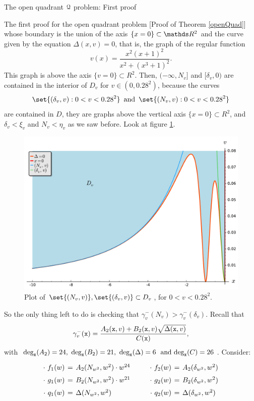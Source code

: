 \documentclass[11pt, a4paper, english, twoside, notitlepage, openright]{report}
\begin{document}
\begin{chapter}{The open quadrant $\mathcal{Q}$ problem: First proof}
\begin{section}{The first proof for the open quadrant problem} [Proof of Theorem \ref{openQuad}]
$$$$ 
whose boundary is the union of the axis $\{x=0\}\subset\R^2$ and the curve given by the equation $\Delta(x,v)=0$, that is, the graph of the regular function
$$
v(x)=\frac{x^2(x+1)^2}{x^2+(x^3+1)^2}.
$$
This graph is above the axis $\{v=0\}\subset R^2$. Then, $(-\infty,N_v]$ and $[\delta_v,0)$ are contained in the interior of $D_v$ for $v\in (0, 0.28^2)$, because the curves 
$$
\set{(\delta_v,v):0<v<0.28^2}\, \, \, \text{and}\, \, \, \set{(N_v,v):0<v<0.28^2}
$$ 
are contained in $D$, they are graphs above the vertical axis $\{x=0\}\subset R^2$, and $\delta_v<\xi_v$ and $N_v<\eta_v$ as we saw before. Look at figure \ref{fig:nice_plot}.

\begin{figure}[h]
\centering
\includegraphics[width=1\textwidth]{plots/ch1_15_nice_plot.pdf}
\caption{Plot of $\set{(N_v,v)}, \set{(\delta_v,v)}\subset D_v$, for $0<v<0.28^2$.\label{fig:nice_plot}}
\end{figure}
So the only thing left to do is checking that $\gamma_v^-(N_v)>\gamma_v^-(\delta_v)$. Recall that 
$$
\gamma_v^-({\tt x})=\dfrac{A_2({\tt x},v)+B_2({\tt x},v)\sqrt{\Delta({\tt x},v)}}{C({\tt x})},
$$
with $\text{deg}_{\tt x}(A_2)=24,\, \, \text{deg}_{\tt x}(B_2)=21,\, \, \text{deg}_{\tt x}(\Delta)=6\, \, \text{ and }\text{deg}_{\tt x}(C)=26$. Consider:
$$
\arraycolsep=2pt\def\arraystretch{1.5}
\begin{array}{rclcrcl}
\cdot\ f_1(w)&=&A_2(N_{w^2},w^2)\cdot w^{24}& \qquad &\cdot\ f_2(w)&=& A_2(\delta_{w^2},w^2)\\
\cdot\ g_1(w)&=&B_2(N_{w^2},w^2)\cdot w^{21}& \qquad &\cdot\ g_2(w)&=&B_2(\delta_{w^2},w^2)\\
\cdot\ q_1(w)&=&\Delta(N_{w^2},w^2)& \qquad &\cdot\ q_2(w)&=&\Delta(\delta_{w^2},w^2)\\

\end{array}$$
\end{section}
\end{chapter}
\end{document}
